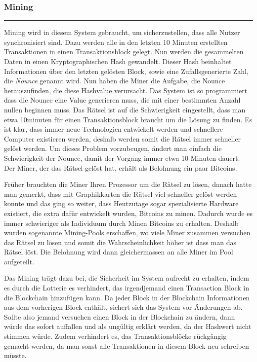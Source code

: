 \vspace*{1mm}
\subsubsection*{Mining}
\vspace{-10mm}
\noindent\rule{0.8\textwidth}{0.4pt}

\vspace{5mm}

\noindent
Mining wird in diesem System gebraucht, um sicherzustellen, dass alle Nutzer synchronisiert sind. Dazu werden alle in den letzten 10 Minuten erstellten Transaktionen in einen Transaktionsblock gelegt.
Nun werden die gesammelten Daten in einen Kryptographischen Hash gewandelt. Dieser Hash beinhaltet Informationen über den letzten gelösten Block, sowie eine Zufallsgenerierte Zahl, die
\emph{\dq Nounce \dq} genannt wird. Nun haben die Miner die Aufgabe, die Nounce herauszufinden, die diese Hashvalue verursacht. Das System ist so programmiert dass die Nounce eine Value
generieren muss, die mit einer bestimmten Anzahl nullen beginnen muss. Das Rätsel ist auf die Schwierigkeit eingestellt, dass man etwa 10minuten für einen Transaktionsblock braucht um die Lösung
zu finden. Es ist klar, dass immer neue Technologien entwickelt werden und schnellere Computer existieren werden, deshalb werden somit die Rätsel immer schneller gelöst werden. Um dieses Problem vorzubeugen,
ändert man einfach die Schwierigkeit der Nounce, damit der Vorgang immer etwa 10 Minuten dauert. Der Miner, der das Rätsel gelöst hat, erhält als Belohnung ein paar Bitcoins.

\noindent
Früher brauchten die Miner Ihren Prozessor um die Rätsel zu lösen, danach hatte man gemerkt, dass mit Graphikkarten die Rätsel viel schneller gelöst werden konnte und das ging so weiter, dass
Heutzutage sogar spezialisierte Hardware existiert, die extra dafür entwickelt wurden, Bitcoins zu minen. Dadurch wurde es immer schwieriger als Individuum durch Minen Bitcoins zu erhalten.
Deshalb wurden sogenannte Mining-Pools erschaffen, wo viele Miner zusammen versuchen das Rätsel zu lösen und somit die Wahrscheinlichkeit höher ist dass man das Rätsel löst. Die Belohnung wird dann
gleichermassen an alle Miner im Pool aufgeteilt.

\noindent
Das Mining trägt dazu bei, die Sicherheit im System aufrecht zu erhalten, indem es durch die Lotterie es verhindert, das irgendjemand einen Transaction Block in die Blockchain hinzufügen kann.
Da jeder Block in der Blockchain Informationen aus dem vorherigen Block enthält, sichert sich das System vor Änderungen ab. Sollte also jemand versuchen einen Block in der Blockchain
zu ändern, dann würde das sofort auffallen und als ungültig erklärt werden, da der Hashwert nicht stimmen würde. Zudem verhindert es, das Transaktionsblöcke rückgängig gemacht werden, da man
sonst alle Transaktionen in diesem Block neu schreiben müsste.

